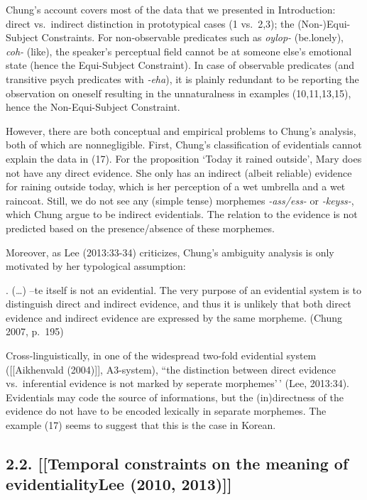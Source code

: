 Chung's account covers most of the data that we presented in
Introduction: direct vs.~indirect distinction in prototypical cases (1
vs.~2,3); the (Non-)Equi-Subject Constraints. For non-observable
predicates such as \emph{oylop-} (be.lonely), \emph{coh-} (like), the
speaker's perceptual field cannot be at someone else's emotional state
(hence the Equi-Subject Constraint). In case of observable predicates
(and transitive psych predicates with \emph{-eha}), it is plainly
redundant to be reporting the observation on oneself resulting in the
unnaturalness in examples (10,11,13,15), hence the Non-Equi-Subject
Constraint.

However, there are both conceptual and empirical problems to Chung's
analysis, both of which are nonnegligible. First, Chung's classification
of evidentials cannot explain the data in (17). For the proposition
`Today it rained outside', Mary does not have any direct evidence. She
only has an indirect (albeit reliable) evidence for raining outside
today, which is her perception of a wet umbrella and a wet raincoat.
Still, we do not see any (simple tense) morphemes \emph{-ass/ess-} or
\emph{-keyss-}, which Chung argue to be indirect evidentials. The
relation to the evidence is not predicted based on the presence/absence
of these morphemes.

Moreover, as Lee (2013:33-34) criticizes, Chung's ambiguity analysis is
only motivated by her typological assumption:

\ex. (\ldots) --te itself is not an evidential. The very purpose of an
evidential system is to distinguish direct and indirect evidence, and
thus it is unlikely that both direct evidence and indirect evidence are
expressed by the same morpheme. (Chung 2007, p.~195)

Cross-linguistically, in one of the widespread two-fold evidential
system ({[}{[}Aikhenvald (2004){]}{]}, A3-system), ``the distinction
between direct evidence vs.~inferential evidence is not marked by
seperate morphemes'\,' (Lee, 2013:34). Evidentials may code the source
of informations, but the (in)directness of the evidence do not have to
be encoded lexically in separate morphemes. The example (17) seems to
suggest that this is the case in Korean.

\hypertarget{temporal-constraints-on-the-meaning-of-evidentialitylee-2010-2013}{%
\subsection{2.2. {[}{[}Temporal constraints on the meaning of
evidentiality\textbar Lee (2010,
2013){]}{]}}\label{temporal-constraints-on-the-meaning-of-evidentialitylee-2010-2013}}

